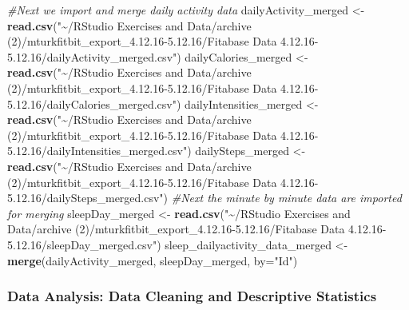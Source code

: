 \documentclass[
]{article}
\newenvironment{Shaded}{\begin{snugshade}}{\end{snugshade}}
\newcommand{\AttributeTok}[1]{\textcolor[rgb]{0.13,0.29,0.53}{#1}}
\newcommand{\CommentTok}[1]{\textcolor[rgb]{0.56,0.35,0.01}{\textit{#1}}}
\newcommand{\FunctionTok}[1]{\textcolor[rgb]{0.13,0.29,0.53}{\textbf{#1}}}
\newcommand{\NormalTok}[1]{#1}
\newcommand{\OtherTok}[1]{\textcolor[rgb]{0.56,0.35,0.01}{#1}}
\newcommand{\StringTok}[1]{\textcolor[rgb]{0.31,0.60,0.02}{#1}}
\begin{document}
\begin{Shaded}
\begin{Highlighting}[]
\CommentTok{\#Next we import and merge daily activity data}
\NormalTok{dailyActivity\_merged }\OtherTok{\textless{}{-}} \FunctionTok{read.csv}\NormalTok{(}\StringTok{"\textasciitilde{}/RStudio Exercises and Data/archive (2)/mturkfitbit\_export\_4.12.16{-}5.12.16/Fitabase Data 4.12.16{-}5.12.16/dailyActivity\_merged.csv"}\NormalTok{)}
\NormalTok{dailyCalories\_merged }\OtherTok{\textless{}{-}} \FunctionTok{read.csv}\NormalTok{(}\StringTok{"\textasciitilde{}/RStudio Exercises and Data/archive (2)/mturkfitbit\_export\_4.12.16{-}5.12.16/Fitabase Data 4.12.16{-}5.12.16/dailyCalories\_merged.csv"}\NormalTok{)}
\NormalTok{dailyIntensities\_merged }\OtherTok{\textless{}{-}} \FunctionTok{read.csv}\NormalTok{(}\StringTok{"\textasciitilde{}/RStudio Exercises and Data/archive (2)/mturkfitbit\_export\_4.12.16{-}5.12.16/Fitabase Data 4.12.16{-}5.12.16/dailyIntensities\_merged.csv"}\NormalTok{)}
\NormalTok{dailySteps\_merged }\OtherTok{\textless{}{-}} \FunctionTok{read.csv}\NormalTok{(}\StringTok{"\textasciitilde{}/RStudio Exercises and Data/archive (2)/mturkfitbit\_export\_4.12.16{-}5.12.16/Fitabase Data 4.12.16{-}5.12.16/dailySteps\_merged.csv"}\NormalTok{)}
\CommentTok{\#Next the minute by minute data are imported for merging}
\NormalTok{sleepDay\_merged }\OtherTok{\textless{}{-}} \FunctionTok{read.csv}\NormalTok{(}\StringTok{"\textasciitilde{}/RStudio Exercises and Data/archive (2)/mturkfitbit\_export\_4.12.16{-}5.12.16/Fitabase Data 4.12.16{-}5.12.16/sleepDay\_merged.csv"}\NormalTok{)}
\NormalTok{sleep\_dailyactivity\_data\_merged }\OtherTok{\textless{}{-}} \FunctionTok{merge}\NormalTok{(dailyActivity\_merged, sleepDay\_merged, }\AttributeTok{by=}\StringTok{"Id"}\NormalTok{)}
\end{Highlighting}
\end{Shaded}

\subsubsection{Data Analysis: Data Cleaning and Descriptive
Statistics}\label{data-analysis-data-cleaning-and-descriptive-statistics}
\end{document}
